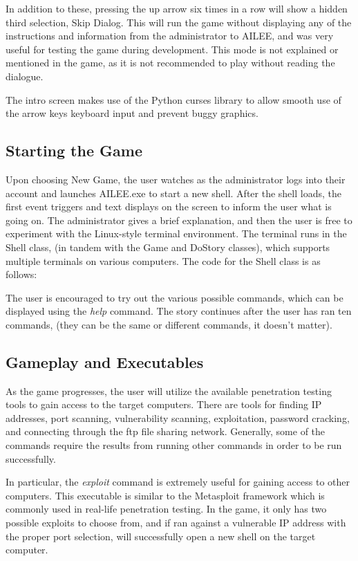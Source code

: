 \documentclass[conference]{IEEEtran}
\begin{document}
In addition to these, pressing the up arrow six times in a row will show a hidden third selection, Skip Dialog. This will run the game without displaying any of the instructions and information from the administrator to AILEE, and was very useful for testing the game during development. This mode is not explained or mentioned in the game, as it is not recommended to play without reading the dialogue.

The intro screen makes use of the Python curses library to allow smooth use of the arrow keys keyboard input and prevent buggy graphics.

\subsection{Starting the Game}
Upon choosing New Game, the user watches as the administrator logs into their account and launches AILEE.exe to start a new shell. After the shell loads, the first event triggers and text displays on the screen to inform the user what is going on. The administrator gives a brief explanation, and then the user is free to experiment with the Linux-style terminal environment. The terminal runs in the Shell class, (in tandem with the Game and DoStory classes), which supports multiple terminals on various computers. The code for the Shell class is as follows:



The user is encouraged to try out the various possible commands, which can be displayed using the \textit{help} command. The story continues after the user has ran ten commands, (they can be the same or different commands, it doesn't matter).

\subsection{Gameplay and Executables}
As the game progresses, the user will utilize the available penetration testing tools to gain access to the target computers. There are tools for finding IP addresses, port scanning, vulnerability scanning, exploitation, password cracking, and connecting through the ftp file sharing network. Generally, some of the commands require the results from running other commands in order to be run successfully. 

In particular, the \textit{exploit} command is extremely useful for gaining access to other computers. This executable is similar to the Metasploit framework which is commonly used in real-life penetration testing. In the game, it only has two possible exploits to choose from, and if ran against a vulnerable IP address with the proper port selection, will successfully open a new shell on the target computer. 
\end{document}
